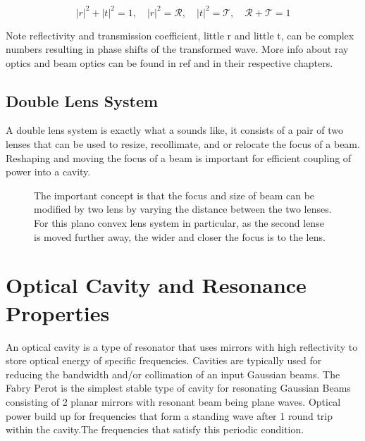 \documentclass[11pt,a4paper]{book}
\newcommand{\imginput}[1]{} %
\begin{document}
		\begin{equation}\label{reflectivity}
			|r|^2+|t|^2=1, \quad |r|^2=\mathcal{R}, \quad |t|^2=\mathcal{T}, \quad \mathcal{R}+\mathcal{T}=1
		\end{equation}
		
		Note reflectivity and transmission coefficient, little r and little t, can be complex numbers resulting in phase shifts of the transformed wave. More info about ray optics and beam optics can be found in ref\cite{SalehTeichs} and \cite{steck} in their respective chapters.
		
		\subsection{Double Lens System}
			\label{subsec:Double Lens System}
			A double lens system is exactly what a sounds like, it consists of a pair of two lenses that can be used to resize, recollimate, and or relocate the focus of a beam. Reshaping and moving the focus of a beam is important for efficient coupling of power into a cavity.
			
			\begin{figure} [!ht]
				\centering
				\def\svgwidth{\columnwidth}
				\resizebox{160mm}{!}{\imginput{images/double-lens-system.pdf_tex}}
				\caption{The important concept is that the focus and size of beam can be modified by two lens by varying the distance between the two lenses. For this plano convex lens system in particular, as the second lense is moved further away, the wider and closer the focus is to the lens.
				}
				\label{fig:double-lens-system}
			\end{figure}
	\section{Optical Cavity and Resonance Properties}
		\label{sec:Optical Cavity and Resonance Properties}
		An optical cavity is a type of resonator that uses mirrors with high reflectivity to store optical energy of specific frequencies. Cavities are typically used for reducing the bandwidth and/or collimation of an input Gaussian beams. The Fabry Perot is the simplest stable type of cavity for resonating Gaussian Beams consisting of 2 planar mirrors with resonant beam being plane waves. Optical power build up for frequencies that form a standing wave after 1 round trip within the cavity.The frequencies that satisfy this periodic condition. 
		
\end{document}
